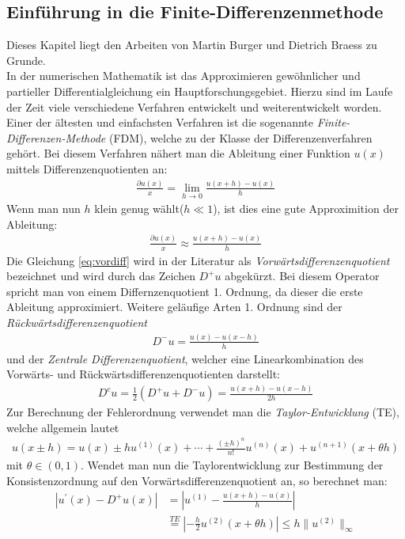 \documentclass[a4paper,11pt]{article}
\begin{document}
\subsection{Einführung in die Finite-Differenzenmethode}
Dieses Kapitel liegt den Arbeiten von Martin Burger \cite{burger2006numerik} und Dietrich Braess \cite{braess2013finite} zu Grunde.\\
In der numerischen Mathematik ist das Approximieren gewöhnlicher und partieller Differentialgleichung ein Hauptforschungsgebiet. Hierzu sind im Laufe der Zeit viele verschiedene Verfahren entwickelt und weiterentwickelt worden. Einer der ältesten  und einfachsten Verfahren ist die sogenannte \textit{Finite-Differenzen-Methode} (FDM), welche zu der Klasse der Differenzenverfahren gehört. Bei diesem Verfahren nähert man die Ableitung einer Funktion $u(x)$ mittels Differenzenquotienten an:
\begin{align}
 \frac{\partial u(x)}{x}=\lim\limits_{h \rightarrow 0} \frac{u(x+h)-u(x)}{h}
\end{align}
Wenn man nun $h$ klein genug wählt($h\ll1$), ist dies eine gute Approximition der Ableitung:
\begin{align}
 \frac{\partial u(x)}{x}\approx \frac{u(x+h)-u(x)}{h}\label{eq:vordiff}
\end{align}
Die Gleichung \eqref{eq:vordiff} wird in der Literatur als \textit{Vorwärtsdifferenzenquotient} bezeichnet und wird durch das Zeichen $D^+u$ abgekürzt. Bei diesem Operator spricht man von einem Differnzenquotient 1. Ordnung, da dieser die erste Ableitung approximiert. Weitere geläufige Arten 1. Ordnung sind der \textit{Rückwärtsdifferenzenquotient}
\begin{align}
 D^-u= \frac{u(x)-u(x-h)}{h}
\end{align}
und der \textit{Zentrale Differenzenquotient}, welcher eine Linearkombination des Vorwärts- und Rückwärtsdifferenzenquotienten darstellt:
\begin{align}
 D^cu=\frac{1}{2}(D^+u+D^-u)= \frac{u(x+h)-u(x-h)}{2h}
\end{align}
Zur Berechnung der Fehlerordnung verwendet man die \textit{Taylor-Entwicklung} (TE), welche allgemein lautet
\begin{align}
 u(x\pm h)=u(x)\pm hu^{(1)}(x)+\cdots+\frac{(\pm h)^n}{n!}u^{(n)}(x)+u^{(n+1)}(x+\theta h)
\end{align}
mit $\theta\in(0,1)$. Wendet man nun die Taylorentwicklung zur Bestimmung der Konsistenzordnung auf den Vorwärtsdifferenzenquotient an, so berechnet man:
\begin{align}
 |u^{'}(x)-D^+u(x)|&=|u^{(1)}-\frac{u(x+h)-u(x)}{h}|\nonumber\\&\overset{TE}{=}|-\frac{h}{2}u^{(2)}(x+\theta h)|\le h\|u^{(2)}\|_{\infty}
\end{align}
\end{document}
